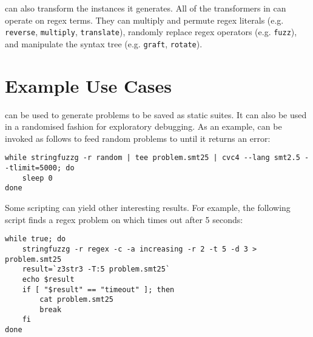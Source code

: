         \fuzzer{} can also transform the instances it generates. All of the transformers in \transformer{} can operate on regex terms. They can multiply and permute regex literals (e.g. \texttt{reverse}, \texttt{multiply}, \texttt{translate}), randomly replace regex operators (e.g. \texttt{fuzz}), and manipulate the syntax tree (e.g. \texttt{graft}, \texttt{rotate}).

        
\section{Example Use Cases}
\vspace{-0.1in}

        \fuzzer{} can be used to generate problems to be saved as static suites. It can also be used in a randomised fashion for exploratory debugging. As an example, \fuzzer{} can be invoked as follows to feed random problems to \cvc{} until it returns an error:
\begin{center}
\vspace{-0.05in}
\begin{varwidth}{\linewidth}
{\scriptsize\begin{verbatim}while stringfuzzg -r random | tee problem.smt25 | cvc4 --lang smt2.5 --tlimit=5000; do
    sleep 0
done
\end{verbatim}}
\end{varwidth}
\end{center}
        Some \unix{} scripting can yield other interesting results. For example, the following script finds a regex problem on which \us{} times out after 5 seconds:
\begin{center}
\vspace{-0.1in}
\begin{varwidth}{\linewidth}
        {\scriptsize\begin{verbatim}while true; do
    stringfuzzg -r regex -c -a increasing -r 2 -t 5 -d 3 > problem.smt25
    result=`z3str3 -T:5 problem.smt25`
    echo $result
    if [ "$result" == "timeout" ]; then
        cat problem.smt25
        break
    fi
done\end{verbatim}}
\end{varwidth}
\end{center}
